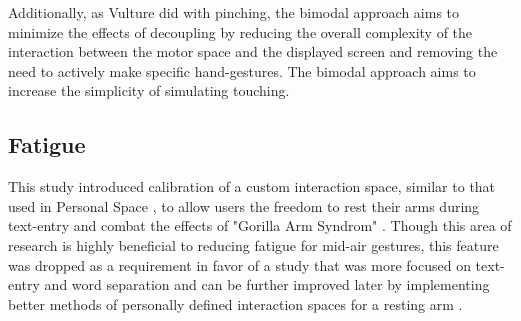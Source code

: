 Additionally, as Vulture did with pinching, the bimodal approach aims to minimize the effects of decoupling by reducing the overall complexity of the interaction between the motor space and the displayed screen and removing the need to actively make specific hand-gestures. The bimodal approach aims to increase the simplicity of simulating touching.

\subsection{Fatigue} \label{gorilla_arm_syndrome}
This study introduced calibration of a custom interaction space, similar to that used in Personal Space \cite{ref_alvin_thesis}, to allow users the freedom to rest their arms during text-entry and combat the effects of "Gorilla Arm Syndrom" \cite{ref_darren_thesis,ref_gorilla_arm}. Though this area of research is highly beneficial to reducing fatigue for mid-air gestures, this feature was dropped as a requirement in favor of a study that was more focused on text-entry and word separation and can be further improved later by implementing better methods of personally defined interaction spaces for a resting arm \cite{ref_alvin_thesis,ref_darren_thesis}. 
